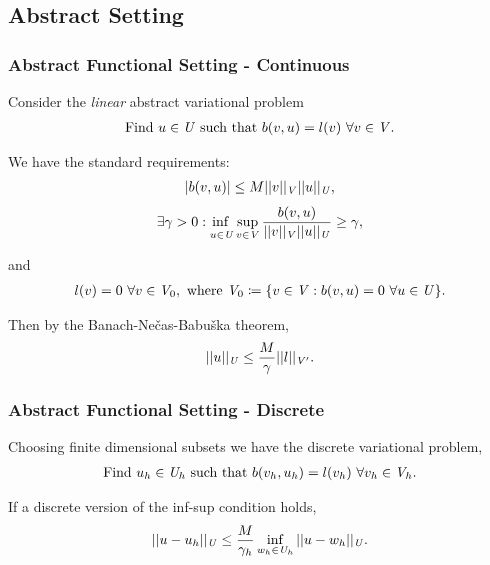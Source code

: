 \subsection{Abstract Setting}

\begin{frame}
\frametitle{Abstract Functional Setting - Continuous}

Consider the \emph{linear} abstract variational problem
\begin{align} \label{eq:bilinear_abstract_infinite}
\text{Find}\ u \in \mathit{{{U}}}\ \text{such that}\
b(v,u) = l(v)\ \forall v \in \mathit{{{V}}}.
\end{align}

We have the standard requirements:
\begin{align}
| b(v,u) | \le M
||v||_{\mathit{{{V}}}}
||u||_{\mathit{{{U}}}},
\end{align}
\begin{align} \label{eq:inf_sup_infinite}
\exists \gamma > 0 :
\adjustlimits\inf_{u\in\fspace{U}} \sup_{v\in\fspace{V}}
\frac{b(v,u)}{||v||_{\fspace{V}}||u||_{\fspace{U}}} \ge \gamma,
\end{align}

and
\begin{align}
l(v) = 0\ \forall v \in \mathit{{{V}}}_0,\ \text{where}\ \mathit{{{V}}}_0 \coloneqq \{v \in \mathit{{{V}}} : b(v,u) = 0\ \forall u
\in \mathit{{{U}}} \}.
\end{align}

Then by the Banach-Ne\v{c}as-Babu\v{s}ka theorem,
\begin{align}
||u||_{\mathit{{{U}}}} \le \frac{M}{\gamma} ||l||_{\mathit{{{V}}}'}.
\end{align}


\end{frame}

\begin{frame}
\frametitle{Abstract Functional Setting - Discrete}

Choosing finite dimensional subsets we have the discrete variational problem,
\begin{align} \label{eq:bilinear_abstract_finite}
\text{Find}\ u_h \in \mathit{{{U}}}_h\ \text{such that}\
b(v_h,u_h) = l(v_h)\ \forall v_h \in \mathit{{{V}}}_h.
\end{align}

If a discrete version of the inf-sup condition holds,
\begin{align} \label{eq:abstract_dpg_error}
||u-u_h||_{\mathit{{{U}}}} \le \frac{M}{\gamma_h} \inf_{w_h \in \mathit{{{U}}}_h} ||u-w_h||_{\mathit{{{U}}}}.
\end{align}

\end{frame}

